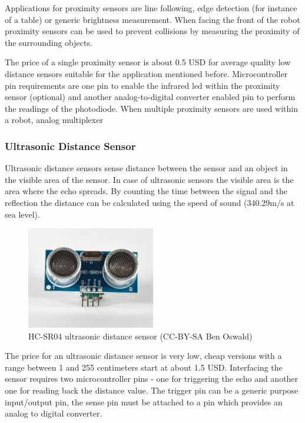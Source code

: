 \documentclass[11pt,a4paper]{article}
\begin{document}
Applications for proximity sensors are line following, edge detection (for instance of a table) or generic brightness measurement. When facing the front of the robot proximity sensors can be used to prevent collisions by measuring the proximity of the surrounding objects.

The price of a single proximity sensor is about 0.5 USD for average quality low distance sensors suitable for the application mentioned before. Microcontroller pin requirements are one pin to enable the infrared led within the proximity sensor (optional) and another analog-to-digital converter enabled pin to perform the readings of the photodiode. When multiple proximity sensors are used within a robot, analog multiplexer 

\subsubsection{Ultrasonic Distance Sensor}
Ultrasonic distance sensors sense distance between the sensor and an object in the visible area of the sensor. In case of ultrasonic sensors the visible area is the area where the echo spreads. By counting the time between the signal and the reflection the distance can be calculated using the speed of sound (340.29m/s at sea level). 

\begin{figure}[H]
  \centering
  \includegraphics[width=0.5\textwidth]{images/30_ultrasonic.jpg}
  \caption{HC-SR04 ultrasonic distance sensor (CC-BY-SA Ben Oswald)}
\end{figure}

The price for an ultrasonic distance sensor is very low, cheap versions with a range between 1 and 255 centimeters start at about 1.5 USD. Interfacing the sensor requires two microcontroller pins - one for triggering the echo and another one for reading back the distance value. The trigger pin can be a generic purpose input/output pin, the sense pin must be attached to a pin which provides an analog to digital converter.
\end{document}
